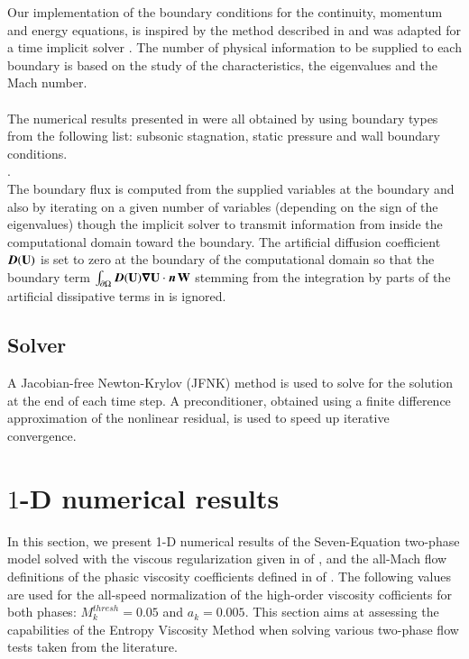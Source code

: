 \documentclass[preprint,10pt]{elsarticle}
\begin{document}
Our implementation of the boundary conditions for the continuity, momentum and energy equations, is inspired by the method described in \cite{Berry_NED2010} and was 
adapted for a time implicit solver \cite{Marco_dissertation}. The number of physical information to be supplied to each boundary is based on the study of the characteristics, the eigenvalues and the Mach number. \\
  \\
The numerical results presented in  were all obtained by using boundary types from the following list: subsonic stagnation, static pressure and wall boundary conditions.
\\ . \\
The boundary flux is computed from the supplied variables at the boundary and also by iterating on a given number of variables (depending on the sign of the eigenvalues) though the implicit 
solver to transmit information from inside the computational domain toward the boundary. 
The artificial diffusion coefficient $\boldsymbol D(\mathbf  U)$ is set to zero at the boundary of the computational 
domain so that the boundary term 
$\int_{\partial \Omega} \boldsymbol D(\mathbf  U) \boldsymbol\nabla \mathbf  U \cdot \boldsymbol n \, \mathbf W$ stemming from the 
integration by parts of the artificial dissipative terms in  is ignored.
%
\subsection{Solver} \label{sec:solver}
%
A Jacobian-free Newton-Krylov (JFNK) method is used to solve for the solution at the end of each time step. A preconditioner, 
obtained using a finite difference approximation of the nonlinear residual, is used to speed up iterative convergence.
%
\section{$1$-D numerical results}\label{sec:results}
%
In this section, we present 1-D numerical results of the Seven-Equation two-phase model solved with the viscous regularization given in  of , 
and the all-Mach flow definitions of the phasic viscosity coefficients defined in  of .
The following values are used for the all-speed normalization of the high-order viscosity cofficients for both phases: $M_k^{thresh}=0.05$ and $a_k=0.005$. 
This section aims at assessing the capabilities of the Entropy 
Viscosity Method when solving various two-phase flow tests taken from the literature. 
\end{document}
